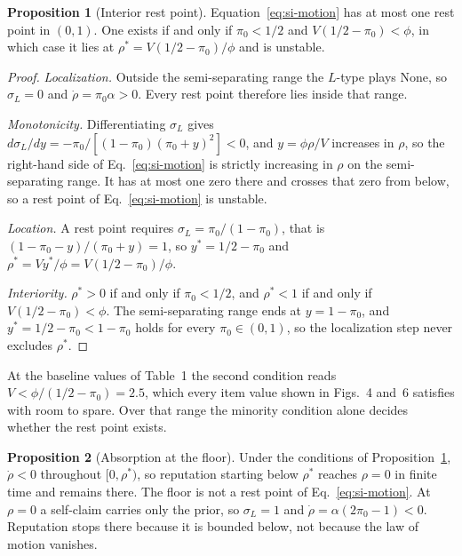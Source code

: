 \documentclass[11pt,letterpaper]{article}
\theoremstyle{definition}
\newtheorem{proposition}{Proposition}[section]
\begin{document}
\begin{proposition}[Interior rest point]\label{prop:dyn-rest}
Equation~\ref{eq:si-motion} has at most one rest point in $(0, 1)$. One exists
if and only if $\pi_0 < 1/2$ and $V(1/2 - \pi_0) < \phi$, in which case it lies
at $\rho^{*} = V(1/2 - \pi_0)/\phi$ and is unstable.
\end{proposition}

\begin{proof}
\textit{Localization.} Outside the semi-separating range the $L$-type plays
None, so $\sigma_L = 0$ and $\dot{\rho} = \pi_0\alpha > 0$. Every rest point
therefore lies inside that range.

\textit{Monotonicity.} Differentiating $\sigma_L$ gives
$d\sigma_L/dy = -\pi_0/[(1 - \pi_0)(\pi_0 + y)^2] < 0$, and $y = \phi\rho/V$
increases in $\rho$, so the right-hand side of Eq.~\ref{eq:si-motion} is
strictly increasing in $\rho$ on the semi-separating range. It has at most one
zero there and crosses that zero from below, so a rest point of
Eq.~\ref{eq:si-motion} is unstable.

\textit{Location.} A rest point requires $\sigma_L = \pi_0/(1 - \pi_0)$, that is
$(1 - \pi_0 - y)/(\pi_0 + y) = 1$, so $y^{*} = 1/2 - \pi_0$ and
$\rho^{*} = V y^{*}/\phi = V(1/2 - \pi_0)/\phi$.

\textit{Interiority.} $\rho^{*} > 0$ if and only if $\pi_0 < 1/2$, and
$\rho^{*} < 1$ if and only if $V(1/2 - \pi_0) < \phi$. The semi-separating range
ends at $y = 1 - \pi_0$, and $y^{*} = 1/2 - \pi_0 < 1 - \pi_0$ holds for every
$\pi_0 \in (0, 1)$, so the localization step never excludes $\rho^{*}$.
\end{proof}

At the baseline values of Table~1 the second condition reads
$V < \phi/(1/2 - \pi_0) = 2.5$, which every item value shown in Figs.~4 and~6
satisfies with room to spare. Over that range the minority condition alone
decides whether the rest point exists.

\begin{proposition}[Absorption at the floor]\label{prop:dyn-floor}
Under the conditions of Proposition~\ref{prop:dyn-rest}, $\dot{\rho} < 0$
throughout $[0, \rho^{*})$, so reputation starting below $\rho^{*}$ reaches
$\rho = 0$ in finite time and remains there. The floor is not a rest point of
Eq.~\ref{eq:si-motion}. At $\rho = 0$ a self-claim carries only the prior, so
$\sigma_L = 1$ and $\dot{\rho} = \alpha(2\pi_0 - 1) < 0$. Reputation stops there
because it is bounded below, not because the law of motion vanishes.
\end{proposition}
\end{document}
